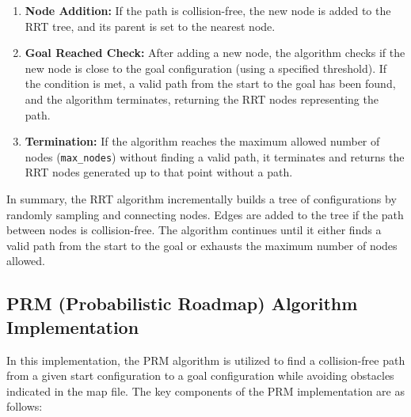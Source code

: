 \documentclass{article}
\begin{document}
\begin{enumerate}
    \item \textbf{Node Addition:} If the path is collision-free, the new node is added to the RRT tree, and its parent is set to the nearest node.

    \item \textbf{Goal Reached Check:} After adding a new node, the algorithm checks if the new node is close to the goal configuration (using a specified threshold). If the condition is met, a valid path from the start to the goal has been found, and the algorithm terminates, returning the RRT nodes representing the path.

    \item \textbf{Termination:} If the algorithm reaches the maximum allowed number of nodes (\texttt{max\_nodes}) without finding a valid path, it terminates and returns the RRT nodes generated up to that point without a path.

\end{enumerate}

In summary, the RRT algorithm incrementally builds a tree of configurations by randomly sampling and connecting nodes. Edges are added to the tree if the path between nodes is collision-free. The algorithm continues until it either finds a valid path from the start to the goal or exhausts the maximum number of nodes allowed.

\subsection{PRM (Probabilistic Roadmap) Algorithm Implementation}

In this implementation, the PRM algorithm is utilized to find a collision-free path from a given start configuration to a goal configuration while avoiding obstacles indicated in the map file. The key components of the PRM implementation are as follows:
\end{document}
